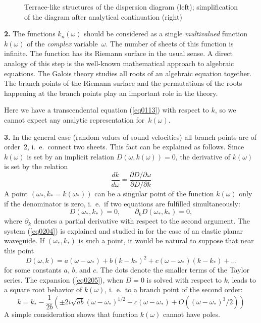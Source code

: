 \documentclass[12pt]{article}
\newcommand{\ptl}{\partial}
\begin{document}
\begin{figure}[ht]
\centerline{}
\caption{Terrace-like structures of the dispersion diagram (left); simplification of the 
diagram after analytical continuation (right)}
\label{fig02}
\end{figure}


{\bf 2.} 
The functions $k_n (\omega)$ should be considered as a single {\em multivalued\/} function
$k(\omega)$
of the {\em complex\/} variable~$\omega$. The number of sheets of this function is infinite. The function has its Riemann surface in the usual sense. A direct analogy of this step is the well-known
mathematical approach to algebraic equations. The Galois theory studies all roots of an algebraic equation together. The branch points of the Riemann surface and the permutations of the roots happening at the branch points play an important role in  the theory. 

Here we have a transcendental equation (\ref{eq0113}) with respect to $k$, so we cannot expect any analytic representation for~$k(\omega)$.

{\bf 3.}
In the general case (random values of sound velocities) all branch points are of order~2, i.~e.\ connect two sheets. This fact can be explained as follows. 
Since $k(\omega)$ is set by an implicit relation $D(\omega , k(\omega)) =0$, the 
derivative of $k(\omega)$ is set by the relation 
\begin{equation}
\frac{d k}{d \omega} = \frac{\ptl D / \ptl \omega}{\ptl D / \ptl k}
\label{eq0203}
\end{equation}  
A point $(\omega_*, k_* = k(\omega_*))$ 
can be a singular point of the function $k(\omega)$ only if  
the denominator is zero, i.~e.\ if two
equations are fulfilled simultaneously: 
\begin{equation}
D(\omega_*, k_*) = 0, 
\qquad 
\ptl_k D(\omega_*, k_*) = 0, 
\label{eq0204}
\end{equation}
where $\ptl_k$ denotes a partial derivative with respect to the second argument. 
The system (\ref{eq0204}) is explained and studied in \cite{Randles} for the case of an elastic 
planar waveguide. 
If $(\omega_* , k_*)$ is such a point, it would be natural to suppose that 
near this point
\begin{equation}
D(\omega , k) = a (\omega- \omega_*) + b (k - k_*)^2 + c (\omega- \omega_*)(k - k_*) +
 \dots
\label{eq0205}
\end{equation} 
for some constants $a$, $b$, and $c$. The dots denote the smaller terms of the Taylor series. 
The expansion (\ref{eq0205}), when $D=0$ is solved with respect to $k$, leads to a square root 
behavior of $k(\omega)$, i.~e.\ to a branch point of the second order:
\[
k = k_* - \frac{1}{2b} \left(\pm 2i \sqrt{a b} (\omega- \omega_*)^{1/2} + 
c (\omega- \omega_*) + O((\omega- \omega_*)^3/2) \right) 
\]
A simple consideration shows that function $k(\omega)$ cannot have poles.  
\end{document}
